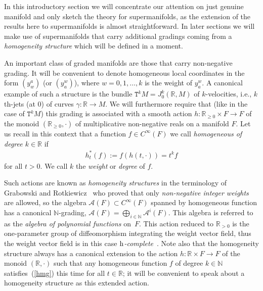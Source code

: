 \documentclass[10pt,a4paper]{amsart}
\def\sT{{\mathtt T}}
\numberwithin{equation}{section}
\begin{document}
In this introductory section we will concentrate our attention on just genuine manifold and only sketch the theory for supermanifolds, as the extension of the results here to supermanifolds is almost straightforward. In later sections we will make use of supermanifolds that carry additional gradings coming from a \emph{homogeneity structure} which will be def\/ined in a moment.

An important class of graded manifolds are those that carry non-negative grading.  It will be convenient to denote homogeneous local coordinates in the form $(y^a_w)$ (or $(y^w_a)$), where $w=0,1,\dots,k$ is the weight of $y^w_a$.
A canonical example of such a structure is the bundle $\sT^kM=J^k_0({\mathbb R},M)$ of $k$-velocities, i.e., $k$th-jets (at $0$) of curves $\gamma\colon {\mathbb R}\to M$. We will furthermore require that (like in the case of $\sT^kM$) this grading is associated with a smooth action $h\colon {\mathbb R}_{\ge 0}\times F\to F$ of the monoid $({\mathbb R}_{\ge 0},\cdot)$ of multiplicative non-negative reals on a manifold $F$. Let us recall in this context that a function $f\in C^\infty(F)$ we call \emph{homogeneous of degree $k\in{\mathbb R}$} if
\begin{gather}\label{hmg}
h_t^*(f):=f(h(t,\cdot))=t^k f
\end{gather}
for all $t>0$. We call $k$  the \emph{weight}  or \emph{degree} of $f$.

Such actions are known as  \emph{homogeneity structures} in the terminology of  Grabowski and Rot\-kie\-wicz~\cite{Grabowski2012} who proved that only \emph{non-negative integer weights} are allowed, so the algebra $\mathcal{A}(F)\subset C^\infty(F)$ spanned by homogeneous function  has a canonical $\mathbb{N}$-grading, $\mathcal{A}(F) = \bigoplus_{i \in \mathbb{N}}\mathcal{A}^{i}(F)$. This algebra  is referred to as the \emph{algebra of polynomial functions} on~$F$.  This action reduced to ${\mathbb R}_{>0}$ is the one-parameter group of dif\/feomorphism integrating the weight vector f\/ield, thus the weight vector f\/ield is in this case \emph{${\rm h}$-complete}~\cite{Grabowski2013}.  Note also that the homogeneity structure always has a canonical extension to the action $h\colon {\mathbb R}\times F\to F$ of the monoid $({\mathbb R},\cdot)$ such that any homogeneous function $f$ of degree $k\in\mathbb{N}$ satisf\/ies~(\ref{hmg}) this time for all $t\in{\mathbb R}$; it will be convenient to speak about a homogeneity structure as  this extended action.
\end{document}
